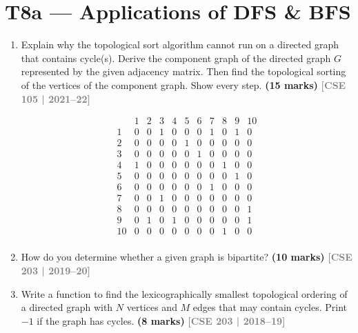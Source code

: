 \documentclass[12pt,a3paper]{article}
\newcommand{\yr}[1]{\hfill\textcolor{gray}{\small\textbf{[#1]}}}
\newcommand{\mk}[1]{\textcolor{orange!70!black}{\small\textbf{(#1 marks)}}}
\begin{document}
\section{T8a --- Applications of DFS \& BFS}

\begin{enumerate}
\item Explain why the topological sort algorithm cannot run on a directed graph that contains cycle(s). Derive the component graph of the directed graph $G$ represented by the given adjacency matrix. Then find the topological sorting of the vertices of the component graph. Show every step. \mk{15}
\yr{CSE 105 | 2021--22}

\[
\begin{array}{c|cccccccccc}
  & 1 & 2 & 3 & 4 & 5 & 6 & 7 & 8 & 9 & 10 \\
\hline
1  & 0 & 0 & 1 & 0 & 0 & 0 & 1 & 0 & 1 & 0 \\
2  & 0 & 0 & 0 & 0 & 1 & 0 & 0 & 0 & 0 & 0 \\
3  & 0 & 0 & 0 & 0 & 0 & 1 & 0 & 0 & 0 & 0 \\
4  & 1 & 0 & 0 & 0 & 0 & 0 & 0 & 1 & 0 & 0 \\
5  & 0 & 0 & 0 & 0 & 0 & 0 & 0 & 0 & 1 & 0 \\
6  & 0 & 0 & 0 & 0 & 0 & 0 & 1 & 0 & 0 & 0 \\
7  & 0 & 0 & 1 & 0 & 0 & 0 & 0 & 0 & 0 & 0 \\
8  & 0 & 0 & 0 & 0 & 0 & 0 & 0 & 0 & 0 & 1 \\
9  & 0 & 1 & 0 & 1 & 0 & 0 & 0 & 0 & 0 & 1 \\
10 & 0 & 0 & 0 & 0 & 0 & 0 & 0 & 1 & 0 & 0 \\
\end{array}
\]

\item How do you determine whether a given graph is bipartite? \mk{10}
\yr{CSE 203 | 2019--20}

\item Write a function to find the lexicographically smallest topological ordering of a directed graph with $N$ vertices and $M$ edges that may contain cycles. Print $-1$ if the graph has cycles. \mk{8}
\yr{CSE 203 | 2018--19}



\end{enumerate}
\end{document}
